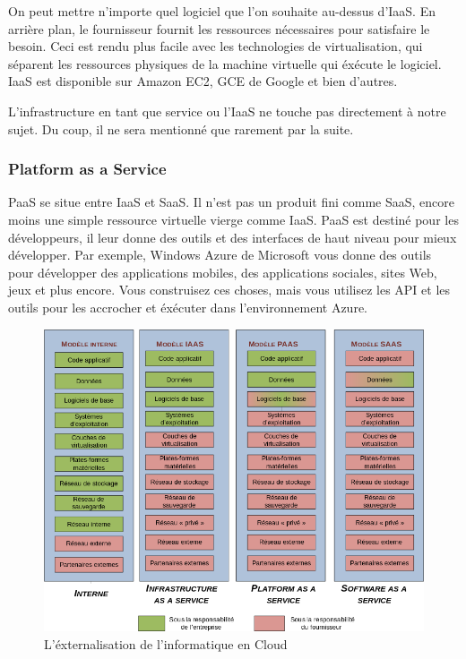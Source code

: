 \begin{onehalfspace}
On peut mettre n'importe quel logiciel que l'on souhaite au-dessus d'IaaS. En arrière plan, le fournisseur fournit les ressources nécessaires pour satisfaire le besoin. Ceci est rendu plus facile avec les technologies de virtualisation, qui séparent les ressources physiques de la machine virtuelle qui éxécute le logiciel. IaaS est disponible sur Amazon EC2, GCE de Google et bien d'autres.

L'infrastructure en tant que service ou l'IaaS ne touche pas directement à notre sujet. Du coup, il ne sera mentionné que rarement par la suite.

\subsubsection*{Platform as a Service}

PaaS se situe entre IaaS et SaaS. Il n'est pas un produit fini comme SaaS, encore moins une simple ressource virtuelle vierge comme IaaS. PaaS est destiné pour les développeurs, il leur donne des outils et des interfaces de haut niveau pour mieux développer. Par exemple, Windows Azure de Microsoft vous donne des outils pour développer des applications mobiles, des applications sociales, sites Web, jeux et plus encore. Vous construisez ces choses, mais vous utilisez les API et les outils pour les accrocher et éxécuter dans l'environnement Azure.


\begin{figure}[H]
\centering
\includegraphics [scale=0.5]{chapitre2/assets/cloud-vs.png}
\caption{L'éxternalisation de l'informatique en Cloud}
\end{figure}



\end{onehalfspace}
